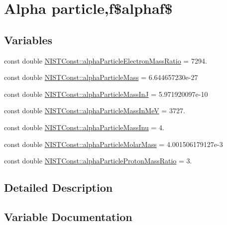 \hypertarget{group___alpha}{}\section{Alpha particle,f\$alphaf\$}
\label{group___alpha}
\subsection*{Variables}
\begin{DoxyCompactItemize}
\item 
const double \hyperlink{group___alpha_ga9f00b32c60f1bc5b8a950b58e64d08c8}{N\+I\+S\+T\+Const\+::alpha\+Particle\+Electron\+Mass\+Ratio} = 7294.
\item 
const double \hyperlink{group___alpha_ga5a2a4f4310d2e3584253471fe4381b93}{N\+I\+S\+T\+Const\+::alpha\+Particle\+Mass} = 6.\+644657230e-\/27
\item 
const double \hyperlink{group___alpha_ga4a65b49a93c81dff12ac24366f68e4e9}{N\+I\+S\+T\+Const\+::alpha\+Particle\+Mass\+InJ} = 5.\+971920097e-\/10
\item 
const double \hyperlink{group___alpha_ga8dd1d38f58ef9d77f39c26be9bb849e0}{N\+I\+S\+T\+Const\+::alpha\+Particle\+Mass\+In\+MeV} = 3727.
\item 
const double \hyperlink{group___alpha_ga1233ffb0d6537e112ce39623e6c6d0d5}{N\+I\+S\+T\+Const\+::alpha\+Particle\+Mass\+Inu} = 4.
\item 
const double \hyperlink{group___alpha_ga06d92f78de04d4e1d79b8468b04959ef}{N\+I\+S\+T\+Const\+::alpha\+Particle\+Molar\+Mass} = 4.\+001506179127e-\/3
\item 
const double \hyperlink{group___alpha_ga4629465057dc35ad7eecca610bcbd092}{N\+I\+S\+T\+Const\+::alpha\+Particle\+Proton\+Mass\+Ratio} = 3.
\end{DoxyCompactItemize}


\subsection{Detailed Description}


\subsection{Variable Documentation}
\mbox{\label{group___alpha_ga9f00b32c60f1bc5b8a950b58e64d08c8}} 
